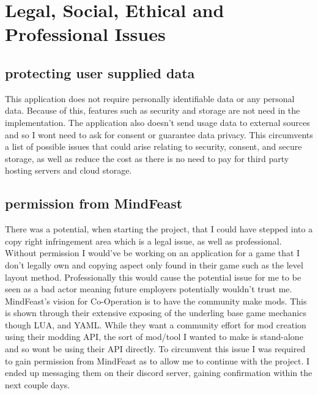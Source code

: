 
\section{Legal, Social, Ethical and Professional Issues}
\subsection{protecting user supplied data}
This application does not require personally identifiable data or any personal data. Because of this, features such as security and storage are not need in the implementation. The application also doesn't send usage data to external sources and so I wont need to ask for consent or guarantee data privacy. This circumvents a list of possible issues that could arise relating to security, consent, and secure storage, as well as reduce the cost as there is no need to pay for third party hosting servers and cloud storage.

\subsection{permission from MindFeast}
There was a potential, when starting the project, that I could have stepped into a copy right infringement area which is a legal issue, as well as professional. Without permission I would've be working on an application for a game that I don't legally own and copying aspect only found in their game such as the level layout method. 
Professionally this would cause the potential issue for me to be seen as a bad actor meaning future employers potentially wouldn't trust me.
MindFeast's vision for Co-Operation is to have the community make mods. This is shown through their extensive exposing of the underling base game mechanics though LUA, and YAML. While they want a community effort for mod creation using their modding API, the sort of mod/tool I wanted to make is stand-alone and so wont be using their API directly. To circumvent this issue I was required to gain permission from MindFeast as to allow me to continue with the project. I ended up messaging them on their discord server, gaining confirmation within the next couple days.

